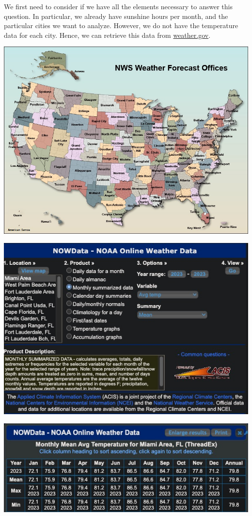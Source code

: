 \documentclass{article}
\begin{document}
We first need to consider if we have all the elements necessary to answer this question.
In particular, we already have sunshine hours per month, and the particular cities we want to analyze.
However, we do not have the temperature data for each city. Hence, we can retrieve this data from \href{https://www.weather.gov/wrh/Climate}{weather.gov}.
\begin{center}
    \vspace{0.5cm}
    \includegraphics[width=\textwidth]{map.jpg}
    
    \includegraphics[width=\textwidth]{datarequest.jpg}
    
    \includegraphics[width=\textwidth]{table.jpg}
        \vspace{0.5cm}
\end{center}
\end{document}
